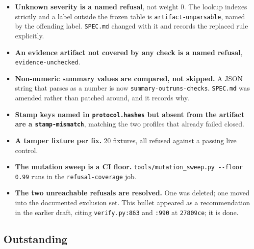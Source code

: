 \documentclass[11pt]{article}
\begin{document}
\begin{itemize}
\item \textbf{Unknown severity is a named refusal}, not weight 0. The lookup indexes strictly
and a label outside the frozen table is \texttt{artifact-unparsable}, named by the offending
label. \texttt{SPEC.md} changed with it and records the replaced rule explicitly.
\item \textbf{An evidence artifact not covered by any check is a named refusal},
\texttt{evidence-unchecked}.
\item \textbf{Non-numeric summary values are compared, not skipped.} A JSON string that parses
as a number is now \texttt{summary-outruns-checks}. \texttt{SPEC.md} was amended rather than
patched around, and it records why.
\item \textbf{Stamp keys named in \texttt{protocol.hashes} but absent from the artifact are a
\texttt{stamp-mismatch}}, matching the two profiles that already failed closed.
\item \textbf{A tamper fixture per fix.} 20 fixtures, all refused against a passing live
control.
\item \textbf{The mutation sweep is a CI floor.} \texttt{tools/mutation\_sweep.py -{}-floor
0.99} runs in the \texttt{refusal-coverage} job.
\item \textbf{The two unreachable refusals are resolved.} One was deleted; one moved into the
documented exclusion set. This bullet appeared as a recommendation in the earlier draft, citing
\texttt{verify.py:863} and \texttt{:990} at \texttt{27809ce}; it is done.
\end{itemize}

\subsection{Outstanding}
\label{sec:fixes-open}
\end{document}
